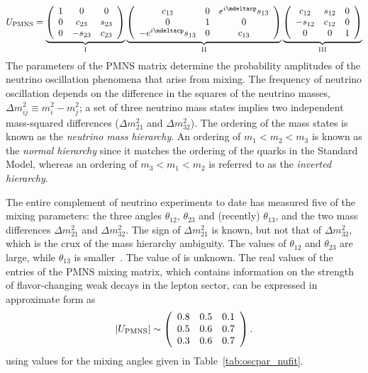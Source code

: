 \begin{equation}
U_{\rm PMNS} = 
  \underbrace{
    \left( \begin{array}{ccc}
        1 & 0 & 0 \\ 
        0 & c_{23} & s_{23} \\ 
        0 & -s_{23} & c_{23}
    \end{array} \right)
  }_{\rm I}
\underbrace{
  \left( \begin{array}{ccc}
      c_{13} & 0 & e^{i\mdeltacp}s_{13} \\ 
      0 & 1 & 0 \\ 
      -e^{i\mdeltacp}s_{13} & 0 & c_{13}
  \end{array} \right) 
}_{\rm II}
\underbrace{
 \left( \begin{array}{ccc}
      c_{12} & s_{12} & 0 \\ 
      -s_{12} & c_{12} & 0 \\ 
      0 & 0 & 1
  \end{array} \right) 
}_{\rm III}
\label{eqn:pmns}
\end{equation}
The parameters of the PMNS
matrix determine the probability amplitudes of the neutrino
oscillation phenomena that arise from mixing.  The frequency of neutrino oscillation 
depends on the difference in the squares of the neutrino
masses, $\Delta m^{2}_{ij} \equiv m^{2}_{i} - m^{2}_{j}$; a set of three
neutrino mass states implies two independent mass-squared differences
($\Delta m^{2}_{21}$ and $\Delta m^{2}_{32}$). The ordering of the
mass states is known as the \emph{neutrino mass hierarchy}. An ordering of
$m_1 < m_2 < m_3$ is known as the \emph{normal hierarchy} since it matches
the ordering of the quarks in the Standard Model, whereas an ordering of $m_3 < m_1 < m_2$
is referred to as the \emph{inverted hierarchy}.

The entire complement of neutrino experiments to date has measured
five of the mixing parameters: the three angles $\theta_{12}$,
$\theta_{23}$ and (recently) $\theta_{13}$, and the two mass differences
$\Delta m^{2}_{21}$ and $\Delta m^{2}_{32}$. The sign of $\Delta
m^{2}_{21}$ is known, but not that of $\Delta m^{2}_{32}$, which 
is the crux of the 
mass hierarchy ambiguity.
The values of $\theta_{12}$ and $\theta_{23}$ are large, while 
$\theta_{13}$ is smaller~\cite{An:2013zwz}. The value of \deltacp is unknown.
The real values of the entries of the PMNS mixing matrix, which
contains information on the strength of flavor-changing weak decays in
the lepton sector, can be expressed in approximate form as
\begin{equation}
|U_{\rm PMNS}|\sim \left(\begin{array}{ccc} 0.8 & 0.5 & 0.1 \\ 0.5 & 0.6 & 0.7 \\ 0.3 & 0.6 & 0.7\end{array} \right).
\label{eq:pmnsmatrix}
\end{equation}
using values for the mixing angles given in Table~\ref{tab:oscpar_nufit}.

